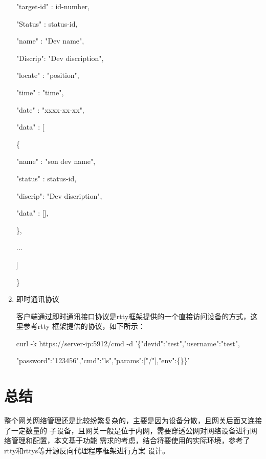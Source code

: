 \documentclass[a4paper,12pt]{report}
\begin{document}
\begin{spacing}{1.5}
\begin{enumerate}[(1)]
\begin{tcolorbox}[notitle,boxrule=0pt,colback=gray!20,colframe=blue!20]
                "target-id"  : id-number,

                "Status" : status-id,

                "name"   : "Dev name",

                "Discrip": "Dev discription",

                "locate" : "position",
                
                "time"   : "time",

                "date"   : "xxxx-xx-xx",

                "data"   : [

                    \quad\{

                        \quad\quad"name"   : "son dev name",

                        \quad\quad"status" : status-id,

                        \quad\quad"discrip": "Dev discription",

                        \quad\quad"data"   : [],

                    \quad\},

                    \quad...
                    
                ]

            \}
        \end{tcolorbox}

    \item 即时通讯协议

        客户端通过即时通讯接口协议是rtty框架提供的一个直接访问设备的方式，这里参考rtty
        框架提供的协议，如下所示：
        \begin{tcolorbox}[notitle,boxrule=0pt,colback=gray!20,colframe=blue!20]
            curl -k https://server-ip:5912/cmd -d '\{"devid":"test","username":"test",

            "password":"123456","cmd":"ls","params":["/"],"env":\{\}\}'
        \end{tcolorbox}

\end{enumerate}

\end{spacing}
\chapter{总结}
\begin{spacing}{1.5}       
    整个网关网络管理还是比较纷繁复杂的，主要是因为设备分散，且网关后面又连接了一定数量的
    子设备，且网关一般是位于内网，需要穿透公网对网络设备进行网络管理和配置，本文基于功能
    需求的考虑，结合将要使用的实际环境，参考了rtty和rttys\cite{rtty.web}等开源反向代理程序框架进行方案
    设计。
\end{spacing}
\end{document}
